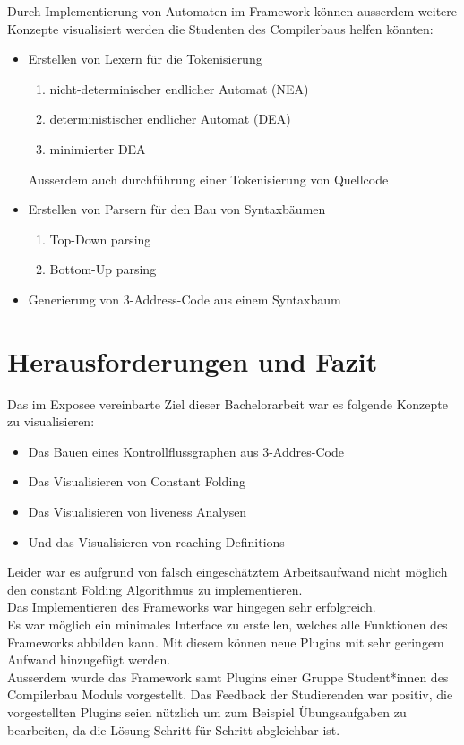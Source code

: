 Durch Implementierung von Automaten im Framework können ausserdem weitere 
Konzepte visualisiert werden die Studenten des Compilerbaus helfen könnten:
\begin{itemize}
  \item Erstellen von Lexern für die Tokenisierung
    \begin{enumerate}
      \item nicht-determinischer endlicher Automat (NEA)
      \item deterministischer endlicher Automat (DEA)
      \item minimierter DEA
    \end{enumerate}
    Ausserdem auch durchführung einer Tokenisierung von Quellcode
  \item Erstellen von Parsern für den Bau von Syntaxbäumen
    \begin{enumerate}
      \item Top-Down parsing
      \item Bottom-Up parsing
    \end{enumerate}
  \item Generierung von 3-Address-Code aus einem Syntaxbaum
\end{itemize}



\newpage
\section{Herausforderungen und Fazit}
Das im Exposee vereinbarte Ziel dieser Bachelorarbeit war es folgende Konzepte zu visualisieren:
\begin{itemize}
  \item Das Bauen eines Kontrollflussgraphen aus 3-Addres-Code
  \item Das Visualisieren von Constant Folding
  \item Das Visualisieren von liveness Analysen
  \item Und das Visualisieren von reaching Definitions
\end{itemize}

Leider war es aufgrund von falsch eingeschätztem Arbeitsaufwand nicht möglich 
den constant Folding Algorithmus zu implementieren.\\

Das Implementieren des Frameworks war hingegen sehr erfolgreich.\\
Es war möglich ein minimales Interface zu erstellen, welches alle
Funktionen des Frameworks abbilden kann. Mit diesem können neue Plugins
mit sehr geringem Aufwand hinzugefügt werden.\\

Ausserdem wurde das Framework samt Plugins einer Gruppe 
Student*innen des Compilerbau Moduls vorgestellt.
Das Feedback der Studierenden war positiv, die vorgestellten Plugins
seien nützlich um zum Beispiel Übungsaufgaben zu bearbeiten,
da die Lösung Schritt für Schritt abgleichbar ist.\\
